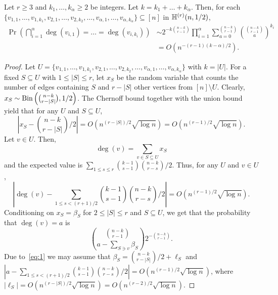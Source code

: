 \documentclass[12pt,reqno]{amsart}
\begin{document}
\begin{lemma}\label{lem:1}
Let $r\ge 3$ and $k_1,\dots,k_\alpha\ge2$ be integers. Let $k = k_1+\dots+k_\alpha$. Then, \whp
for each $\{v_{1,1},\dots,v_{1,k_1},v_{2,1},\dots,v_{2,k_2},\dots,v_{\alpha,1},\dots,v_{\alpha,k_\alpha}\} \subseteq [n]$ in $\mathbb{H}^{({r})}(n,1/2)$,
\begin{align}
\label{lem:1:statement:1} \Pr\left( \bigcap_{i=1}^\alpha \deg(v_{i,1}) = \dots = \deg(v_{i,k_i}) \right) 
&\sim 2^{-k\binom{n-k}{r-1}} \prod_{i=1}^{\alpha} \sum_{a=0}^{\binom{n-k}{r-1}} \binom{\binom{n-k}{r-1}}{a}^{k_i}\\
\label{lem:1:statement:2}&= O(n^{-(r-1)(k-\alpha)/2}).
\end{align}
\end{lemma}

\begin{proof}
Let $U = \{v_{1,1},\dots,v_{1,k_1},v_{2,1},\dots,v_{2,k_2},\dots,v_{\alpha,1},\dots,v_{\alpha,k_\alpha}\}$ with $k=|U|$. For a fixed $S\subseteq U$ with $1\le |S|\le r$, let $x_S$ be the random variable that counts the number of edges containing $S$ and $r-|S|$ other vertices from $[n]\setminus U$. Clearly, $x_S\sim \textrm{Bin}\left( \binom{n-k}{r-|S|},1/2 \right)$.
The Chernoff bound together with the union bound yield that \whp for any $U$ and $S\subseteq U$,
\begin{equation}\label{eq:1}
\left|x_S - {\binom{n-k}{r-|S|}}/{2}\right| = O(n^{(r-|S|)/2}\sqrt{\log n}) = O(n^{(r-1)/2}\sqrt{\log n}).
\end{equation}
Let $v\in U$. Then,
\[
\deg(v) = \sum_{v\in S \subseteq U} x_S
\]
and the expected value is $\sum_{1\le s \le r}\binom{k-1}{s-1} {\binom{n-k}{r-s}}/{2}$.
Thus, \whp for any $U$ and $v\in U$,
\[
\left| \deg(v) - \sum_{1\le s < (r+1)/2}\binom{k-1}{s-1} {\binom{n-k}{r-s}}/{2}\right| = O(n^{(r-1)/2}\sqrt{\log n}).
\]
Conditioning on $x_S=\beta_S$ for $2\le |S|\le r$ and $S\subseteq U$, we get that the probability that $\deg(v) = a$ is 
\[
\binom{\binom{n-k}{r-1}}{a-\sum_{S\ni v}\beta_S} 2^{-\binom{n-k}{r-1}}.
\]
Due to~\eqref{eq:1} we may assume that $\beta_S = {\binom{n-k}{r-|S|}}/{2} + \ell_S$ and  $|a - \sum_{1\le s < (r+1)/2}\binom{k-1}{s-1} {\binom{n-k}{r-s}}/{2}| = O(n^{(r-1)/2}\sqrt{\log n})$, where $|\ell_S| = O(n^{(r-|S|)/2}\sqrt{\log n})=O(n^{(r-2)/2}\sqrt{\log n})$.


\end{proof}
\end{document}
